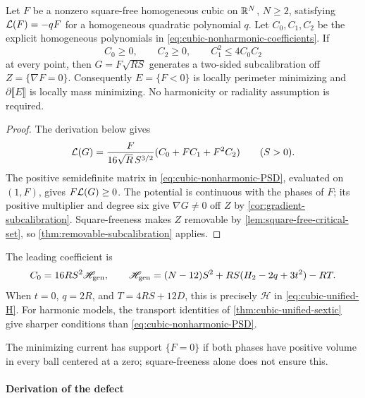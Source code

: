 \begin{proposition}
\label{thm:cubic-nonharmonic-certificate}
Let \(F\) be a nonzero square-free homogeneous cubic on \(\mathbb R^N\),
\(N\ge2\), satisfying \(\mathcal L(F)=-qF\) for a homogeneous quadratic
polynomial \(q\). Let \(C_0,C_1,C_2\) be the explicit homogeneous
polynomials in \eqref{eq:cubic-nonharmonic-coefficients}. If
\begin{equation}\label{eq:cubic-nonharmonic-PSD}
 C_0\ge0,\qquad C_2\ge0,\qquad C_1^2\le4C_0C_2
\end{equation}
at every point, then \(G=F\sqrt{RS}\) generates a two-sided
subcalibration off \(Z=\{\nabla F=0\}\). Consequently
\(E=\{F<0\}\) is locally perimeter minimizing and
\(\partial\llbracket E\rrbracket\) is locally mass minimizing.
No harmonicity or radiality assumption is required.
\end{proposition}

\begin{proof}
The derivation below gives
\begin{equation}\label{eq:cubic-nonharmonic-defect}
 \mathcal L(G)=\frac{F}{16\sqrt R\,S^{3/2}}
                   (C_0+FC_1+F^2C_2)\qquad(S>0).
\end{equation}
The positive semidefinite matrix in \eqref{eq:cubic-nonharmonic-PSD},
evaluated on \((1,F)\), gives \(F\mathcal L(G)\ge0\).
The potential is continuous with the phases of \(F\); its positive
multiplier and degree six give \(\nabla G\ne0\) off \(Z\) by
\cref{cor:gradient-subcalibration}. Square-freeness makes \(Z\)
removable by \cref{lem:square-free-critical-set}, so
\cref{thm:removable-subcalibration} applies.
\end{proof}

The leading coefficient is
\begin{equation}\label{eq:cubic-nonharmonic-leading-H}
 C_0=16RS^2\mathscr H_{\rm gen},\qquad
 \mathscr H_{\rm gen}
 =(N-12)S^2+RS(H_2-2q+3t^2)-RT.
\end{equation}
When \(t=0\), \(q=2R\), and \(T=4RS+12D\), this is precisely
\(\mathscr H\) in \eqref{eq:cubic-unified-H}. For harmonic models,
the transport identities of \cref{thm:cubic-unified-sextic} give sharper
conditions than \eqref{eq:cubic-nonharmonic-PSD}.

The minimizing current has support \(\{F=0\}\) if both phases have
positive volume in every ball centered at a zero; square-freeness
alone does not ensure this.

\paragraph*{Derivation of the defect}

